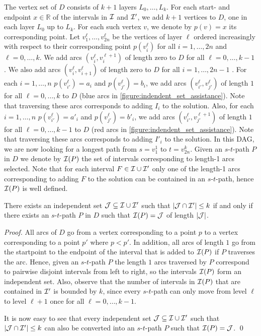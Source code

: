 The vertex set of $D$ consists of $k+1$ layers $L_0, \dots, L_k$. For each start- and endpoint $x \in \mathbb{R}$ of the intervals in $\mathcal{I}$ and $\mathcal{I}'$, we add $k+1$ vertices to $D$,
one in each layer $L_0$ up to $L_k$. For each such vertex $v$, we denote by $p(v) = x$ its corresponding point.
Let $v_1^{\ell}, \dots, v_{2n}^{\ell}$ be the vertices of layer $\ell$ ordered increasingly with respect to 
their corresponding point $p(v_i^{\ell})$ for all $i=1,\dots,2n$ and $\ell=0,\dots,k$.
We add arcs $(v_i^{\ell}, v_i^{\ell+1})$ of length zero to $D$ for all $\ell=0,\dots,k-1$ .
We also add arcs $(v_i^{\ell}, v_{i+1}^{\ell})$ of length zero to $D$ for all $i=1,\dots,2n-1$ .
For each $i=1,\dots,n$  $p(v_{i'}^{\ell}) = a_i$ and $p(v_{j'}^{\ell})=b_i$, we add arcs 
$(v_{i'}^{\ell}, v_{j'}^{\ell})$ of length $1$ for all $\ell=0,\dots, k$ to $D$ (blue arcs in \cref{figure:indendent_set_assistance}). Note that traversing these arcs corresponds 
to adding $I_i$ to the solution. Also, for each $i=1,\dots,n$  $p(v_{i'}^{\ell}) = a'_i$ and $p(v_{j'}^{\ell})=b'_i$, we add arcs 
$(v_{i'}^{\ell}, v_{j'}^{\ell+1})$ of length $1$ for all $\ell=0,\dots,k-1$ to $D$ (red arcs in \cref{figure:indendent_set_assistance}). Note that traversing these arcs corresponds 
to adding $I'_i$ to the solution. In this DAG, we are now looking for a longest path from 
$s=v_1^1$ to $t=v_{2n}^k$. Given an $s$-$t$-path $P$ in $D$ we denote by $\mathcal{I}(P)$ 
the set of intervals corresponding to length-1 arcs selected.
Note that for each interval $F \in \mathcal{I} \cup \mathcal{I}'$ 
only one of the length-1 arcs corresponding to adding $F$ to the solution can be 
contained in an $s$-$t$-path, hence $\mathcal{I}(P)$ is well defined.

\begin{lemma}
    There exists an independent set $\mathcal{J} \subseteq \mathcal{I} \cup \mathcal{I}'$ such that 
    $ |\mathcal{J} \cap \mathcal{I}'| \leq k$ if and only if there exists an $s$-$t$-path $P$ 
    in $D$ such that $\mathcal{I}(P) = \mathcal{J}$ of length $|\mathcal{J}|$.
\end{lemma}
\begin{proof}
    All arcs of $D$ go from a vertex corresponding to a point $p$ 
    to a vertex corresponding to a point $p'$ where $p < p'$. In addition,
    all arcs of length $1$ go from the startpoint to the endpoint of the 
    interval that is added to $\mathcal{I}(P)$ if $P$ traverses the arc. Hence, given an
    $s$-$t$-path $P$ the length $1$ arcs traversed by $P$ correspond to 
    pairwise disjoint intervals from left to right, so the intervals $\mathcal{I}(P)$ form an 
    independent set. Also, observe that the number of intervals in $\mathcal{I}(P)$ that 
    are contained in $\mathcal{I}'$ is bounded by $k$, since every $s$-$t$-path can only 
    move from level $\ell$ to level $\ell+1$ once for all $\ell=0,\dots,k-1$.

    It is now easy to see that every independent set $\mathcal{J} \subseteq \mathcal{I} \cup \mathcal{I}'$ such that 
$ |\mathcal{J} \cap \mathcal{I}'| \leq k$ can also be converted into an $s$-$t$-path $P$ such that $\mathcal{I}(P) = \mathcal{J}$.
\qed\end{proof}

